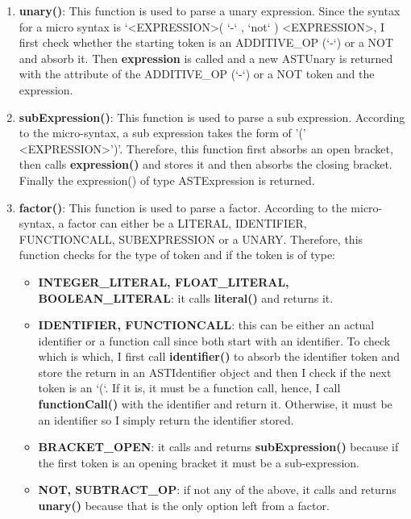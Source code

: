 \documentclass{article}
\begin{document}
\begin{enumerate}
					\item \textbf{unary()}: This function is used to parse a unary expression. Since the syntax for a micro syntax is `\textless EXPRESSION\textgreater ( `-` , `not` ) \textless EXPRESSION\textgreater, I first check whether the starting token is an ADDITIVE\_OP (`-`) or a NOT and absorb it. Then \textbf{expression} is called and a new ASTUnary is returned with the attribute of the ADDITIVE\_OP (`-`) or a NOT token and the expression.
						
				\item \textbf{subExpression()}: This function is used to parse a sub expression. According to the micro-syntax, a sub expression takes the form of '(' \textless EXPRESSION\textgreater ')'. Therefore, this function first absorbs an open bracket, then calls \textbf{expression()} and stores it and then absorbs the closing bracket. Finally the expression() of type ASTExpression is returned.
				
					\item \textbf{factor()}: This function is used to parse a factor. According to the micro-syntax, a factor can either be a LITERAL, IDENTIFIER, FUNCTIONCALL, SUBEXPRESSION or a UNARY. Therefore, this function checks for the type of token and if the token is of type:
				
				\begin{itemize}
				\item \textbf{INTEGER\_LITERAL, FLOAT\_LITERAL, BOOLEAN\_LITERAL}: it calls \textbf{literal()} and returns it.
				\item \textbf{IDENTIFIER, FUNCTIONCALL}: this can be either an actual identifier or a function call since both start with an identifier. To check which is which, I first call \textbf{identifier()} to absorb the identifier token and store the return in an ASTIdentifier object and then I check if the next token is an `(`. If it is, it must be a function call, hence, I call \textbf{functionCall()} with the identifier and return it. Otherwise, it must be an identifier so I simply return the identifier stored.
				\item \textbf{BRACKET\_OPEN}: it calls and returns \textbf{subExpression()} because if the first token is an opening bracket it must be a sub-expression.
				\item \textbf{NOT, SUBTRACT\_OP}: if not any of the above, it calls and returns \textbf{unary()} because that is the only option left from a factor.
			
			
				\end{itemize}
				

\end{enumerate}
\end{document}
